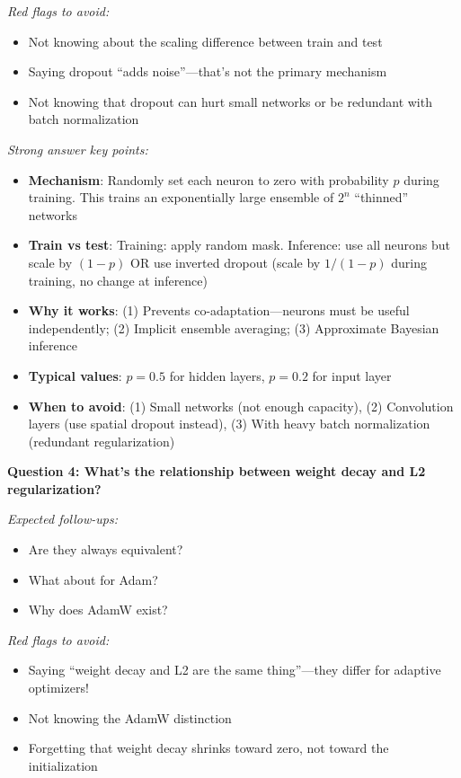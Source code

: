 \documentclass[../../main.tex]{subfiles}
\begin{document}
\begin{interviewquestions}
\textit{Red flags to avoid:}
\begin{itemize}
    \item Not knowing about the scaling difference between train and test
    \item Saying dropout ``adds noise''---that's not the primary mechanism
    \item Not knowing that dropout can hurt small networks or be redundant with batch normalization
\end{itemize}

\textit{Strong answer key points:}
\begin{itemize}
    \item \textbf{Mechanism}: Randomly set each neuron to zero with probability $p$ during training. This trains an exponentially large ensemble of $2^n$ ``thinned'' networks
    \item \textbf{Train vs test}: Training: apply random mask. Inference: use all neurons but scale by $(1-p)$ OR use inverted dropout (scale by $1/(1-p)$ during training, no change at inference)
    \item \textbf{Why it works}: (1) Prevents co-adaptation---neurons must be useful independently; (2) Implicit ensemble averaging; (3) Approximate Bayesian inference
    \item \textbf{Typical values}: $p=0.5$ for hidden layers, $p=0.2$ for input layer
    \item \textbf{When to avoid}: (1) Small networks (not enough capacity), (2) Convolution layers (use spatial dropout instead), (3) With heavy batch normalization (redundant regularization)
\end{itemize}

\vspace{0.5em}
\textbf{Question 4: What's the relationship between weight decay and L2 regularization?}

\textit{Expected follow-ups:}
\begin{itemize}
    \item Are they always equivalent?
    \item What about for Adam?
    \item Why does AdamW exist?
\end{itemize}

\textit{Red flags to avoid:}
\begin{itemize}
    \item Saying ``weight decay and L2 are the same thing''---they differ for adaptive optimizers!
    \item Not knowing the AdamW distinction
    \item Forgetting that weight decay shrinks toward zero, not toward the initialization
\end{itemize}


\end{interviewquestions}
\end{document}
